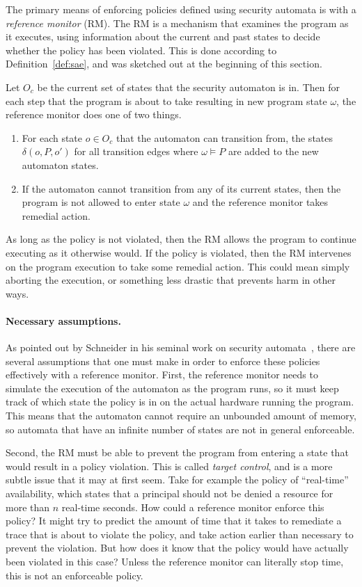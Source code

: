 \documentclass[11pt,twoside]{scrartcl}
\begin{document}
The primary means of enforcing policies defined using security automata is with a \emph{reference monitor} (RM). The RM is a mechanism that examines the program as it executes, using information about the current and past states to decide whether the policy has been violated. This is done according to Definition~\ref{def:sae}, and was sketched out at the beginning of this section.

\begin{definition}
\label{def:sae}
Let $O_c$ be the current set of states that the security automaton is in. Then for each step that the program is about to take resulting in new program state $\omega$, the reference monitor does one of two things.
\begin{enumerate}
\item For each state $o \in O_c$ that the automaton can transition from, the states $\delta(o,P,o')$ for all transition edges where $\omega \vDash P$ are added to the new automaton states.
\item If the automaton cannot transition from any of its current states, then the program is not allowed to enter state $\omega$ and the reference monitor takes remedial action.
\end{enumerate}
\end{definition}

As long as the policy is not violated, then the RM allows the program to continue executing as it otherwise would. If the policy is violated, then the RM intervenes on the program execution to take some remedial action. This could mean simply aborting the execution, or something less drastic that prevents harm in other ways.

\paragraph{Necessary assumptions.} As pointed out by Schneider in his seminal work on security automata~\cite{Schneider2000}, there are several assumptions that one must make in order to enforce these policies effectively with a reference monitor. First, the reference monitor needs to simulate the execution of the automaton as the program runs, so it must keep track of which state the policy is in on the actual hardware running the program. This means that the automaton cannot require an unbounded amount of memory, so automata that have an infinite number of states are not in general enforceable.

Second, the RM must be able to prevent the program from entering a state that would result in a policy violation. This is called \emph{target control}, and is a more subtle issue that it may at first seem. Take for example the policy of ``real-time'' availability, which states that a principal should not be denied a resource for more than $n$ real-time seconds. How could a reference monitor enforce this policy? It might try to predict the amount of time that it takes to remediate a trace that is about to violate the policy, and take action earlier than necessary to prevent the violation. But how does it know that the policy would have actually been violated in this case? Unless the reference monitor can literally stop time, this is not an enforceable policy.
\end{document}
